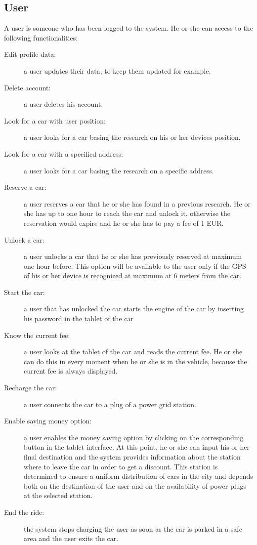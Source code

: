 \subsection{User}
A user is someone who has been logged to the system. He or she can access to the following functionalities:
\begin{description}
\item[Edit profile data:] a user updates their data, to keep them updated for example.
\item[Delete account:] a user deletes his account.
\item[Look for a car with user position:] a user looks for a car basing the research on his or her devices position.
\item[Look for a car with a specified address:] a user looks for a car basing the research on a specific address.
\item[Reserve a car:] a user reserves a car that he or she has found in a previous research. He or she has up to one hour to reach the car and unlock it, otherwise the reservation would expire and he or she has to pay a fee of 1 EUR.
\item[Unlock a car:] a user unlocks a car that he or she has previously reserved at maximum one hour before. This option will be available to the user only if the GPS of his or her device is recognized at maximum at 6 meters from the car.
\item[Start the car:] a user that has unlocked the car starts the engine of the car by inserting his password in the tablet of the car
\item[Know the current fee:] a user looks at the tablet of the car and reads the current fee. He or she can do this in every moment when he or she is in the vehicle, because the current fee is always displayed.
\item[Recharge the car:] a user connects the car to a plug of a power grid station.
\item[Enable saving money option:] a user enables the money saving option by clicking on the corresponding button in the tablet interface. At this point, he or she can input his or her final destination and the system provides information about the station where to leave the car in order to get a discount.
This station is determined to ensure a uniform distribution of cars in the city and depends both on the destination of the user and on the availability of power plugs at the selected station. 
\item[End the ride:] the system stops charging the user as soon as the car is parked in a safe area and the user exits the car.
\end{description}
